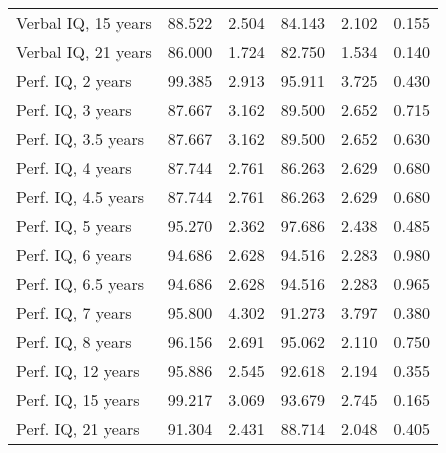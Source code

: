 \begin{tabular}{l c c c c c}
Verbal IQ, 15 years & 88.522 & 2.504 &  84.143 & 2.102 & 0.155 \\
Verbal IQ, 21 years & 86.000 & 1.724 &  82.750 & 1.534 & 0.140 \\
Perf. IQ, 2 years & 99.385 & 2.913 &  95.911 & 3.725 & 0.430 \\
Perf. IQ, 3 years & 87.667 & 3.162 &  89.500 & 2.652 & 0.715 \\
Perf. IQ, 3.5 years & 87.667 & 3.162 &  89.500 & 2.652 & 0.630 \\
Perf. IQ, 4 years & 87.744 & 2.761 &  86.263 & 2.629 & 0.680 \\
Perf. IQ, 4.5 years & 87.744 & 2.761 &  86.263 & 2.629 & 0.680 \\
Perf. IQ, 5 years & 95.270 & 2.362 &  97.686 & 2.438 & 0.485 \\
Perf. IQ, 6 years & 94.686 & 2.628 &  94.516 & 2.283 & 0.980 \\
Perf. IQ, 6.5 years & 94.686 & 2.628 &  94.516 & 2.283 & 0.965 \\
Perf. IQ, 7 years & 95.800 & 4.302 &  91.273 & 3.797 & 0.380 \\
Perf. IQ, 8 years & 96.156 & 2.691 &  95.062 & 2.110 & 0.750 \\
Perf. IQ, 12 years & 95.886 & 2.545 &  92.618 & 2.194 & 0.355 \\
Perf. IQ, 15 years & 99.217 & 3.069 &  93.679 & 2.745 & 0.165 \\
Perf. IQ, 21 years & 91.304 & 2.431 &  88.714 & 2.048 & 0.405 \\
\bottomrule
\end{tabular}
